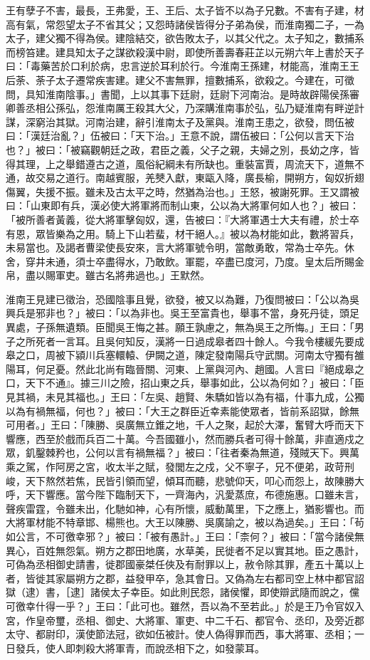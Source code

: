 \begin{pinyinscope}
王有孽子不害，最長，王弗愛，王、王后、太子皆不以為子兄數。不害有子建，材高有氣，常怨望太子不省其父；又怨時諸侯皆得分子弟為侯，而淮南獨二子，一為太子，建父獨不得為侯。建陰結交，欲告敗太子，以其父代之。太子知之，數捕系而榜笞建。建具知太子之謀欲殺漢中尉，即使所善壽春莊芷以元朔六年上書於天子曰：「毒藥苦於口利於病，忠言逆於耳利於行。今淮南王孫建，材能高，淮南王王后荼、荼子太子遷常疾害建。建父不害無罪，擅數捕系，欲殺之。今建在，可徵問，具知淮南陰事。」書聞，上以其事下廷尉，廷尉下河南治。是時故辟陽侯孫審卿善丞相公孫弘，怨淮南厲王殺其大父，乃深購淮南事於弘，弘乃疑淮南有畔逆計謀，深窮治其獄。河南治建，辭引淮南太子及黨與。淮南王患之，欲發，問伍被曰：「漢廷治亂？」伍被曰：「天下治。」王意不說，謂伍被曰：「公何以言天下治也？」被曰：「被竊觀朝廷之政，君臣之義，父子之親，夫婦之別，長幼之序，皆得其理，上之舉錯遵古之道，風俗紀綱未有所缺也。重裝富賈，周流天下，道無不通，故交易之道行。南越賓服，羌僰入獻，東甌入降，廣長榆，開朔方，匈奴折翅傷翼，失援不振。雖未及古太平之時，然猶為治也。」王怒，被謝死罪。王又謂被曰：「山東即有兵，漢必使大將軍將而制山東，公以為大將軍何如人也？」被曰：「被所善者黃義，從大將軍擊匈奴，還，告被曰：『大將軍遇士大夫有禮，於士卒有恩，眾皆樂為之用。騎上下山若蜚，材干絕人。』被以為材能如此，數將習兵，未易當也。及謁者曹梁使長安來，言大將軍號令明，當敵勇敢，常為士卒先。休舍，穿井未通，須士卒盡得水，乃敢飲。軍罷，卒盡已度河，乃度。皇太后所賜金帛，盡以賜軍吏。雖古名將弗過也。」王默然。

淮南王見建已徵治，恐國陰事且覺，欲發，被又以為難，乃復問被曰：「公以為吳興兵是邪非也？」被曰：「以為非也。吳王至富貴也，舉事不當，身死丹徒，頭足異處，子孫無遺類。臣聞吳王悔之甚。願王孰慮之，無為吳王之所悔。」王曰：「男子之所死者一言耳。且吳何知反，漢將一日過成皋者四十餘人。今我令樓緩先要成皋之口，周被下潁川兵塞轘轅、伊闕之道，陳定發南陽兵守武關。河南太守獨有雒陽耳，何足憂。然此北尚有臨晉關、河東、上黨與河內、趙國。人言曰『絕成皋之口，天下不通』。據三川之險，招山東之兵，舉事如此，公以為何如？」被曰：「臣見其禍，未見其福也。」王曰：「左吳、趙賢、朱驕如皆以為有福，什事九成，公獨以為有禍無福，何也？」被曰：「大王之群臣近幸素能使眾者，皆前系詔獄，餘無可用者。」王曰：「陳勝、吳廣無立錐之地，千人之聚，起於大澤，奮臂大呼而天下響應，西至於戲而兵百二十萬。今吾國雖小，然而勝兵者可得十餘萬，非直適戍之眾，釠鑿棘矜也，公何以言有禍無福？」被曰：「往者秦為無道，殘賊天下。興萬乘之駕，作阿房之宮，收太半之賦，發閭左之戍，父不寧子，兄不便弟，政苛刑峻，天下熬然若焦，民皆引領而望，傾耳而聽，悲號仰天，叩心而怨上，故陳勝大呼，天下響應。當今陛下臨制天下，一齊海內，汎愛蒸庶，布德施惠。口雖未言，聲疾雷霆，令雖未出，化馳如神，心有所懷，威動萬里，下之應上，猶影響也。而大將軍材能不特章邯、楊熊也。大王以陳勝、吳廣諭之，被以為過矣。」王曰：「茍如公言，不可徼幸邪？」被曰：「被有愚計。」王曰：「柰何？」被曰：「當今諸侯無異心，百姓無怨氣。朔方之郡田地廣，水草美，民徙者不足以實其地。臣之愚計，可偽為丞相御史請書，徙郡國豪桀任俠及有耐罪以上，赦令除其罪，產五十萬以上者，皆徙其家屬朔方之郡，益發甲卒，急其會日。又偽為左右都司空上林中都官詔獄（逮）書，［逮］諸侯太子幸臣。如此則民怨，諸侯懼，即使辯武隨而說之，儻可徼幸什得一乎？」王曰：「此可也。雖然，吾以為不至若此。」於是王乃令官奴入宮，作皇帝璽，丞相、御史、大將軍、軍吏、中二千石、都官令、丞印，及旁近郡太守、都尉印，漢使節法冠，欲如伍被計。使人偽得罪而西，事大將軍、丞相；一日發兵，使人即刺殺大將軍青，而說丞相下之，如發蒙耳。


\end{pinyinscope}
